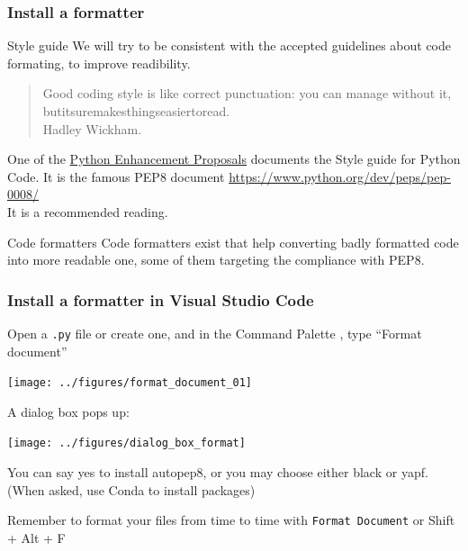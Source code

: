 \documentclass[9pt]{beamer}
\begin{document}
\begin{frame}
  \frametitle{Install a formatter}
  \begin{block}{Style guide}
    We will try to be consistent with the accepted guidelines about
    code formating, to improve readibility.
  \end{block}
  \pause
  \begin{quote}
    Good coding style is like correct punctuation: you can manage without it, butitsuremakesthingseasiertoread.\\
    Hadley Wickham.
  \end{quote}
  \pause
  One of the \href{https://www.python.org/dev/peps/}{Python
    Enhancement Proposals}  documents the Style guide for Python
  Code. It is the famous PEP8 document
  \href{https://www.python.org/dev/peps/pep-0008/}{https://www.python.org/dev/peps/pep-0008/}\\
  It is a recommended reading.\pause \\ \medskip
  \begin{block}{Code formatters}
    Code formatters exist that help converting badly formatted code
    into more readable one, some of them targeting the compliance with PEP8.
  \end{block}
\end{frame}
\begin{frame}
  \frametitle{Install a formatter in Visual Studio Code}
  Open a {\tt .py} file or create one, and in the Command Palette ,
  type ``Format document''
  \begin{center}
    \texttt{[image: ../figures/format\_document\_01]}
  \end{center}
  A dialog box pops up:
  \begin{center}
    \texttt{[image: ../figures/dialog\_box\_format]}
  \end{center}
  You can say yes to install autopep8, or you may choose either black
  or yapf. (When asked, use Conda to install packages)\pause
  \begin{block}{}
    Remember to format your files from time to time with {\tt Format
      Document} or Shift + Alt + F
  \end{block}

  
\end{frame}
\end{document}
